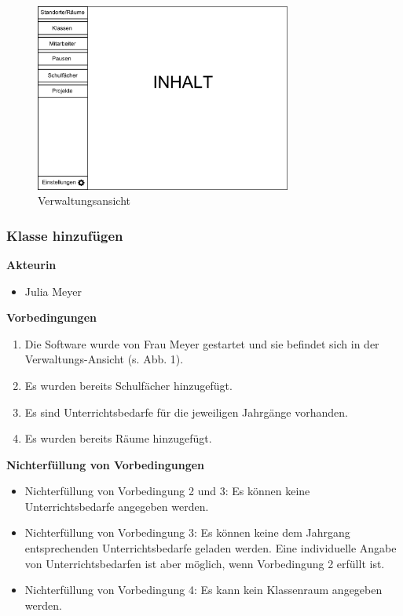 \documentclass[fontsize=12pt,paper=a4,twoside]{scrartcl}
\begin{document}
\begin{figure}[H]
\caption{Verwaltungsansicht}
\includegraphics[width=0.75\textwidth]{mainpage_idea.png}
\end{figure}
\vspace{5pt}



\subsubsection{Klasse hinzufügen}
\label{subsubsec:KlasseHinzufuegen}
\textbf{Akteurin}
\begin{itemize}
\item Julia Meyer
\end{itemize}
\vspace{5pt}


\textbf{Vorbedingungen}
\begin{enumerate}
\item Die Software wurde von Frau Meyer gestartet und sie befindet sich in der Verwaltungs-Ansicht (s. Abb. 1).
\item Es wurden bereits Schulfächer hinzugefügt.
\item Es sind Unterrichtsbedarfe für die jeweiligen Jahrgänge vorhanden.
\item Es wurden bereits Räume hinzugefügt.
\end{enumerate}
\vspace{5pt}


\textbf{Nichterfüllung von Vorbedingungen}
\begin{itemize}
\item Nichterfüllung von Vorbedingung 2 und 3: Es können keine Unterrichtsbedarfe angegeben werden.
\item Nichterfüllung von Vorbedingung 3: Es können keine dem Jahrgang entsprechenden Unterrichtsbedarfe geladen werden. Eine individuelle Angabe von Unterrichtsbedarfen ist aber möglich, wenn Vorbedingung 2 erfüllt ist.
\item Nichterfüllung von Vorbedingung 4: Es kann kein Klassenraum angegeben werden.
\end{itemize}
\vspace{5pt}
\end{document}
